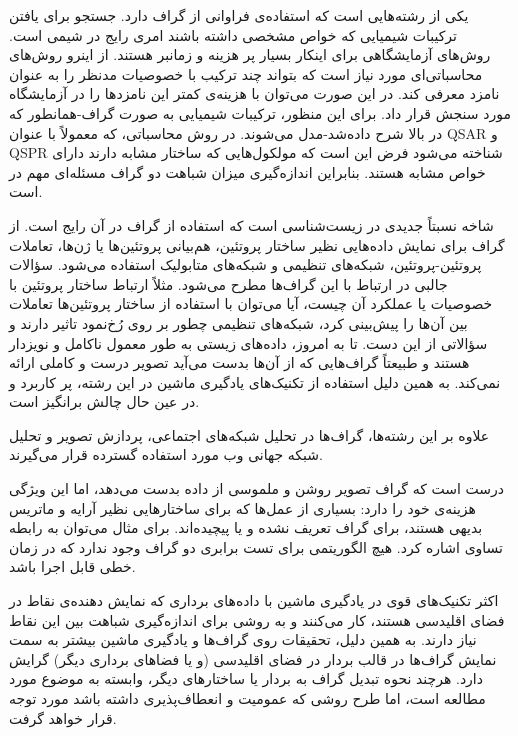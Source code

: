  یکی از رشته‌هایی است که استفاده‌ی فراوانی از گراف دارد. جستجو برای یافتن ترکیبات شیمیایی‌ که خواص مشخصی داشته باشند امری رایج در شیمی است. روش‌های آزمایشگاهی برای اینکار بسیار پر هزینه و زمانبر هستند. از اینرو روش‌های محاسباتی‌ای مورد نیاز است که بتواند چند ترکیب با خصوصیات مدنظر را به عنوان نامزد معرفی کند. در این صورت می‌توان با هزینه‌ی کمتر این نامزدها را در آزمایشگاه مورد سنجش قرار داد. برای این منظور، ترکیبات شیمیایی به صورت گراف-همانطور که در بالا شرح داده‌شد-مدل می‌شوند. در روش محاسباتی، که معمولاً با عنوان QSAR و QSPR شناخته می‌شود فرض این است که مولکول‌هایی که ساختار مشابه دارند دارای خواص مشابه هستند. بنابراین اندازه‌گیری میزان شباهت دو گراف مسئله‌ای مهم در  است.

 شاخه نسبتاً جدیدی در زیست‌شناسی است که استفاده از گراف در آن رایج است. از گراف‌ برای نمایش داده‌هایی نظیر ساختار پروتئین‌، هم‌بیانی پروتئین‌ها یا ژن‌ها، تعاملات پروتئین-پروتئین، شبکه‌های تنظیمی و شبکه‌های متابولیک استفاده می‌شود. سؤالات جالبی در ارتباط با این گراف‌ها مطرح می‌شود. مثلاً ارتباط ساختار پروتئین با خصوصیات یا عملکرد آن چیست، آیا می‌توان با استفاده از ساختار پروتئین‌ها تعاملات بین آن‌ها را پیش‌بینی کرد، شبکه‌های تنظیمی چطور بر روی رُخ‌نمود تاثیر دارند و سؤالاتی از این دست. تا به امروز، داده‌های زیستی به طور معمول ناکامل و نویزدار هستند و طبیعتاً گراف‌هایی که از آن‌ها بدست می‌آید تصویر درست و کاملی ارائه نمی‌کند. به همین دلیل استفاده از تکنیک‌های یادگیری ماشین در این رشته، پر کاربرد و در عین حال چالش برانگیز است.

علاوه بر این رشته‌ها، گراف‌ها در تحلیل شبکه‌های اجتماعی، پردازش تصویر و تحلیل شبکه‌ جهانی وب مورد استفاده گسترده قرار می‌گیرند.

درست است که گراف تصویر روشن و ملموسی از داده بدست می‌دهد، اما این ویژگی هزینه‌ی خود را دارد: بسیاری از عمل‌ها که برای ساختارهایی نظیر آرایه و ماتریس بدیهی هستند، برای گراف تعریف نشده و یا پیچیده‌اند. برای مثال می‌توان به رابطه تساوی اشاره کرد. هیچ الگوریتمی برای تست برابری دو گراف وجود ندارد که در زمان خطی قابل اجرا باشد.

اکثر تکنیک‌های قوی در یادگیری ماشین با داده‌های برداری که نمایش دهنده‌ی نقاط در فضای اقلیدسی هستند، کار می‌کنند و به روشی برای اندازه‌گیری شباهت بین این نقاط نیاز دارند. به همین دلیل، تحقیقات روی گراف‌ها و یادگیری ماشین بیشتر به سمت نمایش گراف‌ها در قالب بردار در فضای اقلیدسی (و یا فضاهای برداری دیگر) گرایش دارد. هرچند نحوه تبدیل گراف به بردار یا ساختارهای دیگر، وابسته به موضوع مورد مطالعه است، اما طرح روشی که عمومیت و انعطاف‌پذیری داشته باشد مورد توجه قرار خواهد گرفت.

